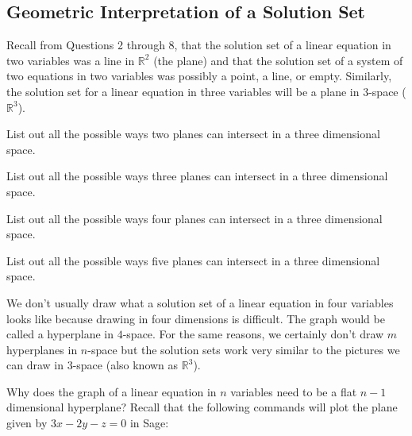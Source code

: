 \subsection{Geometric Interpretation of a Solution Set}

Recall from Questions 2 through 8, that the solution set of a linear equation in two variables was a line in $\mathbb{R}^2$ (the plane) and that the solution set of a system of two equations in two variables was possibly a point, a line, or empty. Similarly, the solution set for a linear equation in three variables will be a plane in 3-space ($\mathbb{R}^3$).

\begin{question}\be
\item List out all the possible ways two planes can intersect in a three dimensional space.
\item List out all the possible ways three planes can intersect in a three dimensional space.
\item List out all the possible ways four planes can intersect in a three dimensional space.
\item List out all the possible ways five planes can intersect in a three dimensional space.
\begin{annotation}
\end{annotation}
\ee\end{question}

We don't usually draw what a solution set of a linear equation in four variables looks like because drawing in four dimensions is difficult. The graph would be called a hyperplane in $4$-space. For the same reasons, we certainly don't draw $m$ hyperplanes in $n$-space but the solution sets work very similar to the pictures we can draw in 3-space (also known as $\mathbb{R}^3$).

\bq Why does the graph of a linear equation in $n$ variables need to be a flat $n-1$ dimensional hyperplane?
\eq
Recall that the following commands will plot the plane given by $3x-2y-z=0$ in Sage:

